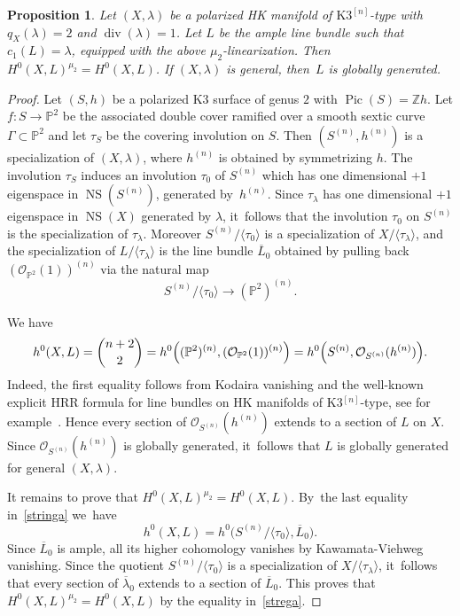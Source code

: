 \documentclass[11pt]{article}
\newcommand{\HK}{\textup{HK}\xspace}
\newcommand{\PP}{{\mathbb P}}\let\P\PP
\newcommand{\ZZ}{{\mathbb Z}}\let\Z\ZZ
\newcommand\cO{\mathcal{O}}
\DeclareMathOperator{\divisore}{div}\let\div\divisore
\DeclareMathOperator{\NS}{NS}
\DeclareMathOperator{\Pic}{Pic}
\let\la\langle
\let\ov\overline
\let\ra\rangle
\newtheorem{prop}[lemm]{Proposition}
\theoremstyle{definition}
\begin{document}
\begin{prop}\label{prop:sezinv}
Let $(X,\lambda)\!$ be a polarized \HK manifold of $\mathrm{K3}^{[n]}$-type with~\hbox{$q_X(\lambda)\!=\!2$} and $\divisore(\lambda)=1$.
Let $L$ be the ample line bundle such that $c_1(L)=\lambda$, equipped with the above $\mu_2$-linearization.
Then $H^0(X,L)^{\mu_2}=H^0(X,L)$.
If $(X,\lambda)$ is general, then~$L$ is globally generated.
\end{prop}

\begin{proof}
Let $(S,h)$ be a polarized K3 surface of genus $2$ with $\Pic(S)=\ZZ h$.
Let $f\colon S\to\PP^2$ be the associated double cover ramified over a smooth sextic curve $\Gamma\subset \PP^2$ and let $\tau_S$ be the covering involution on $S$.
Then $(S^{(n)},h^{(n)})$ is a specialization of $(X,\lambda)$, where $h^{(n)}$ is obtained by symmetrizing $h$.
The involution $\tau_S$ induces an involution $\tau_0$ of $S^{(n)}$ which has one dimensional $+1$ eigenspace in $\NS(S^{(n)})$, generated by~$h^{(n)}$.
Since $\tau_{\lambda}$ has one dimensional $+1$ eigenspace in $\NS(X)$ generated by $\lambda$, it~follows that the involution $\tau_0$ on $S^{(n)}$ is the specialization of $\tau_{\lambda}$.
Moreover $S^{(n)}/\la\tau_0\ra$ is a specialization of $X/\la\tau_{\lambda}\ra$, and the specialization of $L/\langle \tau_\lambda\rangle$ is the line bundle $\ov{L}_0$ obtained by pulling back $(\cO_{\PP^2}(1))^{(n)}$
via the natural map\vspace*{-3pt}\enlargethispage{\baselineskip}
\begin{equation*}
S^{(n)}/\la\tau_0\ra\to(\PP^2)^{(n)}.
\end{equation*}
\par\vspace*{-5pt}%
\noindent
We have\vspace*{-5pt}
\begin{equation}\label{stringa}
h^0(X,L)=\binom{n+2}{2}=h^0\Bigl((\PP^2)^{(n)},(\cO_{\PP^2}(1))^{(n)}\Bigr)=h^0\Bigl(S^{(n)},\cO_{S^{(n)}}(h^{(n)})\Bigr).
\end{equation}
Indeed, the first equality follows from Kodaira vanishing and the well-known explicit HRR formula for line bundles on \HK manifolds of K3$^{[n]}$-type, see for example~\cite[Eq.\,(5)]{Debarre:Survey}.
Hence every section of $\cO_{S^{(n)}}(h^{(n)})$ extends to a section of $L$ on $X$.
Since $\cO_{S^{(n)}}(h^{(n)})$ is globally generated, it~follows that $L$ is globally generated for general $(X,\lambda)$.

It remains to prove that $H^0(X,L)^{\mu_2}\!=\!H^0(X,L)$. By~the last equality in~\eqref{stringa} we~have\vspace*{-5pt}
\begin{equation}\label{strega}
h^0(X,L)=h^0\bigl(S^{(n)}/\la\tau_0\ra,\ov{L}_0\bigr).
\end{equation}
Since $\ov{L}_0$ is ample, all its higher cohomology vanishes by Kawamata-Viehweg vanishing.
Since the quotient $S^{(n)}/\la \tau_0\ra$ is a specialization of $X/\la\tau_{\lambda}\ra$, it~follows that every section of $\ov{\lambda}_0$ extends to a section of $\ov{L}_0$. This proves that $H^0(X,L)^{\mu_2}=H^0(X,L)$ by the equality in~\eqref{strega}.
\end{proof}
\end{document}
